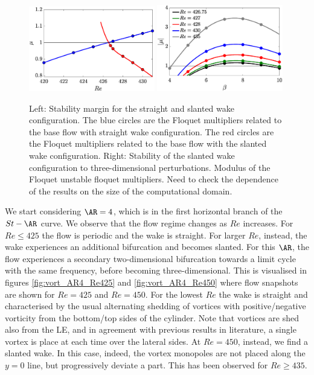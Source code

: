 \documentclass{jfm}
\begin{document}
\begin{figure}
\centering
\includegraphics[width=0.49\textwidth]{./fig/AR4_2Dbif_multipliers.eps}
\includegraphics[width=0.49\textwidth]{./fig/AR4_3Dbif_multipliers.eps}
\caption{Left: Stability margin for the straight and slanted wake configuration. The blue circles are the Floquet multipliers related to the base flow with straight wake configuration. The red circles are the Floquet multipliers related to the base flow with the slanted wake configuration. Right: Stability of the slanted wake configuration to three-dimensional perturbations. Modulus of the Floquet unstable floquet multipliers. {\color{red} Need to check the dependence of the results on the size of the computational domain}.}
\label{fig:2Dmultipliers}
\end{figure}

We start considering $\AR=4$, which is in the first horizontal branch of the $St-\AR$ curve. We observe that the flow regime changes as $Re$ increases. For $Re \le 425$ the flow is periodic and the wake is straight. For larger $Re$, instead, the wake experiences an additional bifurcation and becomes slanted. For this $\AR$, the flow experiences a secondary two-dimensional bifurcation towards a limit cycle with the same frequency, before becoming three-dimensional. This is visualised in figures \ref{fig:vort_AR4_Re425} and \ref{fig:vort_AR4_Re450} where flow snapshots are shown for $Re=425$ and $Re=450$. For the lowest $Re$ the wake is straight and characterised by the usual alternating shedding of vortices with positive/negative vorticity from the bottom/top sides of the cylinder. Note that vortices are shed also from the LE, and in agreement with previous results in literature, a single vortex is place at each time over the lateral sides. At $Re=450$, instead, we find a slanted wake. In this case, indeed, the vortex monopoles are not placed along the $y=0$ line, but progressively deviate a part. This has been observed for $Re \ge 435$. 
\end{document}

